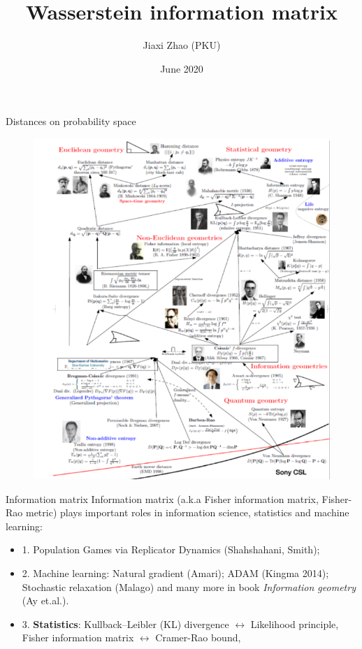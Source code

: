 \documentclass{beamer}
\title{Wasserstein information matrix}
\author{Jiaxi Zhao (PKU)}
\institute[]{joint work with Wuchen Li (UCLA)}
\date{June 2020}
\begin{document}
\begin{frame}
\titlepage
\end{frame}

\begin{frame}{Distances on probability space}
    \begin{figure}[H]
          \centering
          \centerline{\includegraphics[width=0.6\linewidth]{history.png}}
        \end{figure}
\end{frame}

\begin{frame}{Information matrix}
Information matrix (a.k.a Fisher information matrix, Fisher-Rao metric) plays important roles in information science, statistics and machine learning:

\vspace{0.5cm}
\begin{itemize} 
\item 1. Population Games via Replicator Dynamics (Shahshahani, Smith);
\item 2. Machine learning: Natural gradient (Amari); ADAM (Kingma 2014); Stochastic relaxation (Malago) and many more in book {\em Information geometry} (Ay et.al.).
\item 3. \textbf{Statistics}: Kullback--Leibler (KL) divergence $\leftrightarrow$ Likelihood principle, Fisher information matrix $\leftrightarrow$ Cramer-Rao bound, 
\end{itemize}
\end{frame}
\end{document}
